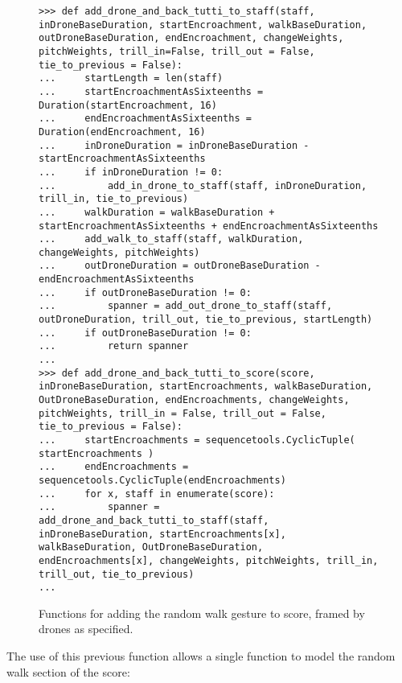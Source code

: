 \begin{figure}[H]
\begin{lstlisting}[basicstyle=\scriptsize\ttfamily, breaklines=True, tabsize=4, showtabs=false, showspaces=false]
>>> def add_drone_and_back_tutti_to_staff(staff, inDroneBaseDuration, startEncroachment, walkBaseDuration, outDroneBaseDuration, endEncroachment, changeWeights, pitchWeights, trill_in=False, trill_out = False, tie_to_previous = False):
...     startLength = len(staff)
...     startEncroachmentAsSixteenths = Duration(startEncroachment, 16)
...     endEncroachmentAsSixteenths = Duration(endEncroachment, 16)
...     inDroneDuration = inDroneBaseDuration - startEncroachmentAsSixteenths
...     if inDroneDuration != 0:
...         add_in_drone_to_staff(staff, inDroneDuration, trill_in, tie_to_previous)
...     walkDuration = walkBaseDuration + startEncroachmentAsSixteenths + endEncroachmentAsSixteenths
...     add_walk_to_staff(staff, walkDuration, changeWeights, pitchWeights)
...     outDroneDuration = outDroneBaseDuration - endEncroachmentAsSixteenths
...     if outDroneBaseDuration != 0:
...         spanner = add_out_drone_to_staff(staff, outDroneDuration, trill_out, tie_to_previous, startLength)
...     if outDroneBaseDuration != 0:
...         return spanner
... 
>>> def add_drone_and_back_tutti_to_score(score, inDroneBaseDuration, startEncroachments, walkBaseDuration, OutDroneBaseDuration, endEncroachments, changeWeights, pitchWeights, trill_in = False, trill_out = False, tie_to_previous = False):
...     startEncroachments = sequencetools.CyclicTuple( startEncroachments )
...     endEncroachments = sequencetools.CyclicTuple(endEncroachments)
...     for x, staff in enumerate(score):
...         spanner = add_drone_and_back_tutti_to_staff(staff, inDroneBaseDuration, startEncroachments[x], walkBaseDuration, OutDroneBaseDuration, endEncroachments[x], changeWeights, pitchWeights, trill_in, trill_out, tie_to_previous)
... \end{lstlisting}

\caption{Functions for adding the random walk gesture to score, framed by drones as specified. } 
\end{figure}

The use of this previous function allows a single function to model the random walk section of the score:

